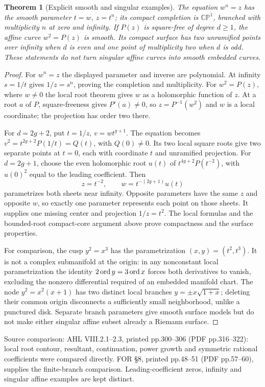 \documentclass[11pt,a4paper,openany]{book}
\newtheorem{theorem}{Theorem}[chapter]
\theoremstyle{definition}
\theoremstyle{remark}\newtheorem{remark}[theorem]{Remark}
\newcommand{\family}[1]{}
\newcommand{\source}[1]{\par\begingroup\small\sffamily\color{black!65}Source comparison: #1\par\endgroup}
\begin{document}
\begin{theorem}[Explicit smooth and singular examples]\label{d12:21-07}\family{D12.21.07}
The equation $w^n=z$ has the smooth parameter $t=w$, $z=t^n$; its compact
completion is $\mathbb{CP}^1$, branched with multiplicity $n$ at zero
and infinity. If $P(z)$ is square-free of degree $d\ge1$, the affine
curve $w^2=P(z)$ is smooth. Its compact surface has two unramified
points over infinity when $d$ is even and one point of multiplicity two
when $d$ is odd. These statements do not turn singular affine curves
into smooth embedded curves.
\end{theorem}
\begin{proof}
For $w^n=z$ the displayed parameter and inverse are polynomial. At
infinity $s=1/t$ gives $1/z=s^n$, proving the completion and multiplicity.
For $w^2=P(z)$, where $w\ne0$ the local root theorem gives $w$ as a
holomorphic function of $z$. At a root $a$ of $P$, square-freeness gives
$P'(a)\ne0$, so $z=P^{-1}(w^2)$ and $w$ is a local coordinate; the
projection has order two there.

For $d=2g+2$, put $t=1/z$, $v=wt^{g+1}$. The equation becomes
$v^2=t^{2g+2}P(1/t)=Q(t)$, with $Q(0)\ne0$. Its two local square
roots give two separate points at $t=0$, each with coordinate $t$ and
unramified projection. For $d=2g+1$, choose the even holomorphic root
$u(t)$ of $t^{4g+2}P(t^{-2})$, with $u(0)^2$ equal to the leading
coefficient. Then
\[
                  z=t^{-2},\qquad w=t^{-(2g+1)}u(t)
\]
parametrizes both sheets near infinity. Opposite parameters have the
same $z$ and opposite $w$, so exactly one parameter represents each
point on those sheets. It supplies one missing center and projection
$1/z=t^2$. The local formulas and the bounded-root compact-core
argument above prove compactness and the surface properties.

For comparison, the cusp $y^2=x^3$ has the parametrization
$(x,y)=(t^2,t^3)$. It is not a complex submanifold at the origin:
in any nonconstant local parametrization the identity
$2\operatorname{ord} y=3\operatorname{ord} x$ forces both derivatives to vanish, excluding the
nonzero differential required of an embedded manifold chart. The node
$y^2=x^2(x+1)$ has two distinct local branches
$y=\pm x\sqrt{1+x}$; deleting their common origin disconnects a
sufficiently small neighborhood, unlike a punctured disk. Separate
branch parameters give smooth surface models but do not make either
singular affine subset already a Riemann surface.
\end{proof}
\source{AHL VIII.2.1--2.3, printed pp.300--306 (PDF pp.316--322):
local root contour, resultant, continuation, power growth and symmetric
rational coefficients were compared directly. FOR \S8, printed
pp.48--51 (PDF pp.57--60), supplies the finite-branch comparison.
Leading-coefficient zeros, infinity and singular affine examples are
kept distinct.}
\end{document}

